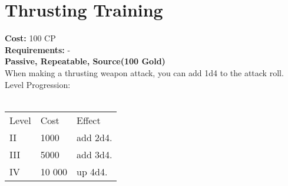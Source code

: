 \section{Thrusting Training}
\textbf{Cost:} 100 CP\\
\textbf{Requirements:} -\\
\textbf{Passive, Repeatable, Source(100 Gold)}\\
When making a thrusting weapon attack, you can add 1d4 to the attack roll.
\\
Level Progression:\\
\\
\begin{tabular}{l | l | l}
	Level & Cost & Effect\\
	II & 1000 & add 2d4.\\
	III & 5000 & add 3d4.\\
	IV & 10 000 & up 4d4.\\
\end{tabular}